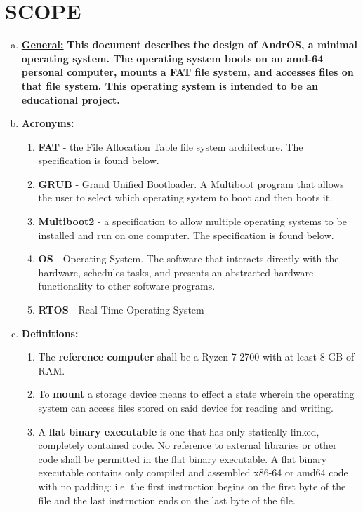 \section{SCOPE}

\begin{enumerate}[(a)]
	\item \textbf{\underline{General:}} \textbf{This document describes the design of AndrOS, 
    a minimal operating system. The operating system boots on an amd-64 personal computer, 
    mounts a FAT file system, and accesses files on that file system. 
    This operating system is intended to be an educational project.}
\bigskip

	\item \textbf{\underline{Acronyms:}}
    \begin{enumerate}[]
      \item \textbf{FAT} - the File Allocation Table file system architecture. The specification is found below.
      \item \textbf{GRUB} - Grand Unified Bootloader. A Multiboot program that allows the user to select which operating system to boot and then boots it.
      \item \textbf{Multiboot2} - a specification to allow multiple operating systems to be installed and run on one computer. The specification is found below.
      \item \textbf{OS} - Operating System. The software that interacts directly with the hardware, schedules tasks, and presents an abstracted hardware functionality to other software programs.
      \item \textbf{RTOS} - Real-Time Operating System
    \end{enumerate}
  \item \textbf{Definitions:} 
    \begin{enumerate}[]
      \item The \textbf{reference computer} shall be a Ryzen 7 2700 with at least 8 GB of RAM.
      \item To \textbf{mount} a storage device means to effect a state wherein the operating system can access files stored on said device for reading and writing.
      \item A \textbf{flat binary executable} is one that has only statically linked, completely contained code. No reference to external libraries or other code shall be permitted in the flat binary executable. A flat binary executable contains only compiled and assembled x86-64 or amd64 code with no padding: i.e. the first instruction begins on the first byte of the file and the last instruction ends on the last byte of the file.
    \end{enumerate}


\end{enumerate}
